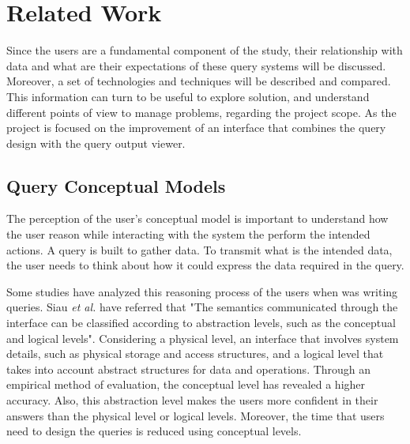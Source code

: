 \chapter{Related Work}
\label{cha:related_work}
Since the users are a fundamental component of the study, their relationship with data and what are their expectations of these query systems will be discussed. Moreover, a set of technologies and techniques will be described and compared. This information can turn to be useful to explore solution, and understand different points of view to manage problems, regarding the project scope. As the project is focused on the improvement of an interface that combines the query design with the query output viewer. 

\section{Query Conceptual Models}
\label{sec:query_conceptual_models}
The perception of the user's conceptual model is important to understand how the user reason while interacting with the system the perform the intended actions. A query is built to gather data. To transmit what is the intended data, the user needs to think about how it could express the data required in the query.


Some studies have analyzed this reasoning process of the users when was writing queries. Siau \textit{et al.} \cite{effectsOfQueryComplexityAndLearningOnNoviceUserQueryPerformance} have referred that "The semantics communicated through the interface can be classified according to abstraction levels, such as the conceptual and logical levels". Considering a physical level, an interface that involves system details, such as physical storage and access structures, and a logical level that takes into account abstract structures for data and operations. Through an empirical method of evaluation, the conceptual level has revealed a higher accuracy. Also, this abstraction level makes the users more confident in their answers than the physical level or logical levels. Moreover, the time that users need to design the queries is reduced using conceptual levels. \cite{effectsOfQueryComplexityAndLearningOnNoviceUserQueryPerformance}

